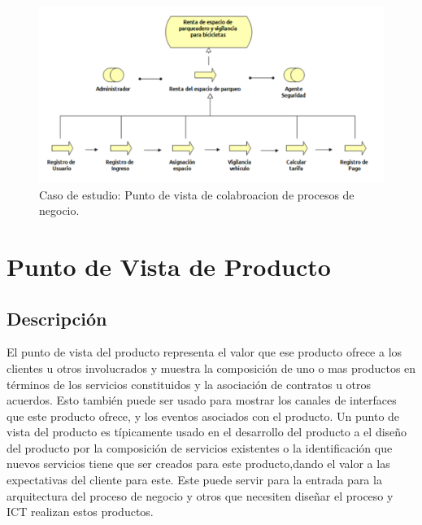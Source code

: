 \begin{figure}[H]
	\centering
	\includegraphics[width=1.0\textwidth]{imagenes/Caso_estudio/Negocio/CoProNegocios.PDF}
	\caption{Caso de estudio: Punto de vista de colabroacion de procesos de negocio.}
	\label{fig:gap_analysis}
\end{figure}


\section{Punto de Vista de Producto}

\subsection{Descripción}
El punto de vista del producto representa el valor que ese producto ofrece a los clientes u otros involucrados y muestra la composición de uno o mas productos en términos de los servicios constituidos y la asociación de contratos u otros acuerdos. Esto también puede ser usado para mostrar los canales de interfaces que este producto ofrece, y los eventos asociados con el producto. Un punto de vista del producto es típicamente usado en el desarrollo del producto a el diseño del producto por la composición de servicios existentes o la identificación que nuevos servicios tiene que ser creados para este producto,dando el valor a las expectativas del cliente para este. Este puede servir para la entrada para la arquitectura del proceso de negocio y otros que necesiten diseñar el proceso y ICT realizan estos productos. 

